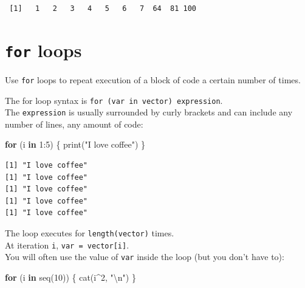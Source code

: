 \documentclass[
]{book}
\newenvironment{Shaded}{\begin{snugshade}}{\end{snugshade}}
\newcommand{\ControlFlowTok}[1]{\textcolor[rgb]{0.13,0.29,0.53}{\textbf{#1}}}
\newcommand{\DecValTok}[1]{\textcolor[rgb]{0.00,0.00,0.81}{#1}}
\newcommand{\FunctionTok}[1]{\textcolor[rgb]{0.00,0.00,0.00}{#1}}
\newcommand{\NormalTok}[1]{#1}
\newcommand{\SpecialCharTok}[1]{\textcolor[rgb]{0.00,0.00,0.00}{#1}}
\newcommand{\StringTok}[1]{\textcolor[rgb]{0.31,0.60,0.02}{#1}}
\begin{document}
\begin{verbatim}
 [1]   1   2   3   4   5   6   7  64  81 100
\end{verbatim}

\hypertarget{for-loops}{%
\section{\texorpdfstring{\texttt{for} loops}{for loops}}\label{for-loops}}

\begin{rmdtip}
Use \texttt{for} loops to repeat execution of a block of code a certain
number of times.
\end{rmdtip}

The for loop syntax is \texttt{for\ (var\ in\ vector)\ expression}.\\
The \texttt{expression} is usually surrounded by curly brackets and can include any number of lines, any amount of code:

\begin{Shaded}
\begin{Highlighting}[]
\ControlFlowTok{for}\NormalTok{ (i }\ControlFlowTok{in} \DecValTok{1}\SpecialCharTok{:}\DecValTok{5}\NormalTok{) \{}
  \FunctionTok{print}\NormalTok{(}\StringTok{"I love coffee"}\NormalTok{)}
\NormalTok{\}}
\end{Highlighting}
\end{Shaded}

\begin{verbatim}
[1] "I love coffee"
[1] "I love coffee"
[1] "I love coffee"
[1] "I love coffee"
[1] "I love coffee"
\end{verbatim}

The loop executes for \texttt{length(vector)} times.\\
At iteration \texttt{i}, \texttt{var\ =\ vector{[}i{]}}.\\
You will often use the value of \texttt{var} inside the loop (but you don't have to):

\begin{Shaded}
\begin{Highlighting}[]
\ControlFlowTok{for}\NormalTok{ (i }\ControlFlowTok{in} \FunctionTok{seq}\NormalTok{(}\DecValTok{10}\NormalTok{)) \{}
  \FunctionTok{cat}\NormalTok{(i}\SpecialCharTok{\^{}}\DecValTok{2}\NormalTok{, }\StringTok{"}\SpecialCharTok{\textbackslash{}n}\StringTok{"}\NormalTok{)}
\NormalTok{\}}
\end{Highlighting}
\end{Shaded}
\end{document}
